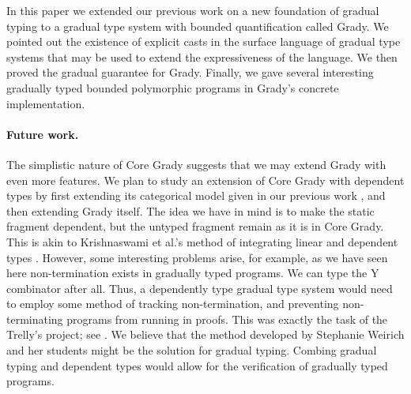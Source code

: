 In this paper we extended our previous work \cite{Eades:2017} on a new
foundation of gradual typing to a gradual type system with bounded
quantification called Grady.  We pointed out the existence of explicit
casts in the surface language of gradual type systems that may be used
to extend the expressiveness of the language.  We then proved the
gradual guarantee for Grady.  Finally, we gave several interesting
gradually typed bounded polymorphic programs in Grady's concrete
implementation.

\paragraph{Future work.}  The simplistic nature of Core Grady suggests
that we may extend Grady with even more features.  We plan to study an
extension of Core Grady with dependent types by first extending its
categorical model given in our previous work \cite{Eades:2017}, and
then extending Grady itself.  The idea we have in mind is to make the
static fragment dependent, but the untyped fragment remain as it is in
Core Grady.  This is akin to Krishnaswami et al.'s method of
integrating linear and dependent types
\cite{Krishnaswami:2015:ILD:2676726.2676969}.  However, some
interesting problems arise, for example, as we have seen here
non-termination exists in gradually typed programs.  We can type the Y
combinator after all.  Thus, a dependently type gradual type system
would need to employ some method of tracking non-termination, and
preventing non-terminating programs from running in proofs.  This was
exactly the task of the Trelly's project; see \cite{?}.  We believe
that the method developed by Stephanie Weirich and her students
\cite{Casinghino:2014:CPP:2535838.2535883} might be the solution for
gradual typing.  Combing gradual typing and dependent types would
allow for the verification of gradually typed programs.
